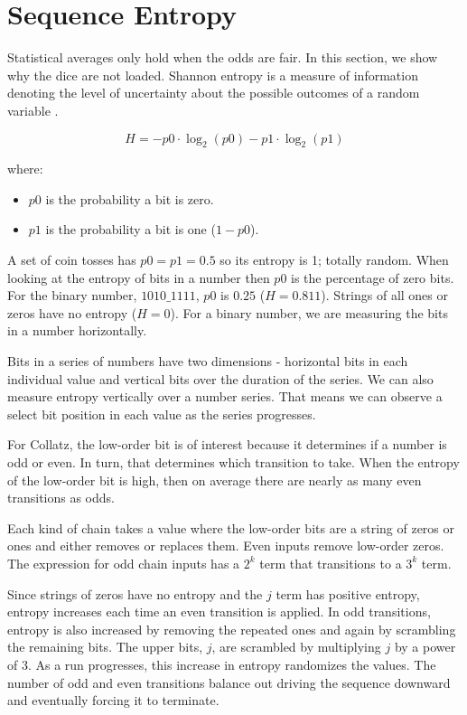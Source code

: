\documentclass[preprint,natbib]{sigplanconf}
\begin{document}
\section{Sequence Entropy}

Statistical averages only hold when the odds are fair. In this section, we show why the dice are not loaded. Shannon entropy is a measure of information denoting the level of uncertainty about the possible outcomes of a random variable \cite{1}.

\[
    H = -p0 \cdot \log_2(p0) - p1 \cdot \log_2(p1)
\]

where:
\begin{itemize}
    \item $p0$ is the probability a bit is zero.
    \item $p1$ is the probability a bit is one ($1 - p0$).
\end{itemize}

A set of coin tosses has $p0 = p1 = 0.5$ so its entropy is 1; totally random. When looking at the entropy of bits in a number then $p0$ is the percentage of zero bits. For the binary number, $1010\_1111$, $p0$ is $0.25$ ($H = 0.811$). Strings of all ones or zeros have no entropy ($H = 0$). For a binary number, we are measuring the bits in a number horizontally.

Bits in a series of numbers have two dimensions - horizontal bits in each individual value and vertical bits over the duration of the series. We can also measure entropy vertically over a number series. That means we can observe a select bit position in each value as the series progresses.

For Collatz, the low-order bit is of interest because it determines if a number is odd or even. In turn, that determines which transition to take. When the entropy of the low-order bit is high, then on average there are nearly as many even transitions as odds.

Each kind of chain takes a value where the low-order bits are a string of zeros or ones and either removes or replaces them. Even inputs remove low-order zeros. The expression for odd chain inputs has a $2^k$ term that transitions to a $3^k$ term.

Since strings of zeros have no entropy and the $j$ term has positive entropy, entropy increases each time an even transition is applied. In odd transitions, entropy is also increased by removing the repeated ones and again by scrambling the remaining bits. The upper bits, $j$, are scrambled by multiplying $j$ by a power of 3. As a run progresses, this increase in entropy randomizes the values. The number of odd and even transitions balance out driving the sequence downward and eventually forcing it to terminate.
\end{document}
